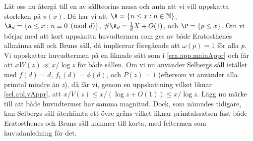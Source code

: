 Låt oss nu återgå till en av sållteorins musa och anta att vi vill uppskatta storleken på \(\pi(x)\). 
Då har vi att \(\A = \{n \leq x: n \in \mathbb{N}\}\), \(\A_d = \{n \leq x: n\equiv 0 \pmod d\}\), \(\#\A_d = \frac{1}{d}X + O(1)\), och \(\P = \{p \leq x\}\). 
Om vi börjar med att kort uppskatta huvudtermen som ges av både Eratosthenes allmänna såll och Bruns såll, då implicerar föregående att \(\omega(p) = 1\) för alla \textit{p}.
Vi uppskattar huvudtermen på en liknade sätt som i \eqref{era.app.mainAppr} och får att \(xW(z) \ll x/\log z\) för både sållen.
Om vi nu använder Selbergs såll istället med \(f(d) = d\), \(f_1(d) = \phi(d)\), och \(\overline{P}(z) = 1\) (eftersom vi använder alla primtal mindre än \textit{z}), då får vi, genom en uppskattning vilket liknar \eqref{sel.apl.vAppr}, att \(x/V(z) \leq x/(\log z + O(1)) \leq x/\log z\).
Lägg nu märke till att både huvudtermer har samma magnitud.
Dock, som nämndes tidigare, kan Selbergs såll återhämta ett övre gräns vilket liknar primtalssatsen fast både Eratosthenes och Bruns såll kommer till korta, med feltermen som huvudanledning för det.


